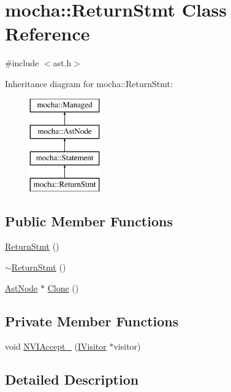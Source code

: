 \hypertarget{classmocha_1_1_return_stmt}{
\section{mocha::ReturnStmt Class Reference}
\label{classmocha_1_1_return_stmt}
}


{\ttfamily \#include $<$ast.h$>$}

Inheritance diagram for mocha::ReturnStmt:\begin{figure}[H]
\begin{center}
\leavevmode
\includegraphics[height=4.000000cm]{classmocha_1_1_return_stmt}
\end{center}
\end{figure}
\subsection*{Public Member Functions}
\begin{DoxyCompactItemize}
\item 
\hyperlink{classmocha_1_1_return_stmt_a416f97238fd91a560a43ecbc970bd61d}{ReturnStmt} ()
\item 
\hyperlink{classmocha_1_1_return_stmt_a5c7ec18f8b005f1970cdd3561222ee05}{$\sim$ReturnStmt} ()
\item 
\hyperlink{classmocha_1_1_ast_node}{AstNode} $\ast$ \hyperlink{classmocha_1_1_return_stmt_a4a65d3a8063b56db840396bbfee0f533}{Clone} ()
\end{DoxyCompactItemize}
\subsection*{Private Member Functions}
\begin{DoxyCompactItemize}
\item 
void \hyperlink{classmocha_1_1_return_stmt_a13dd108e4f098a6f4e1ea39afa217bbc}{NVIAccept\_\-} (\hyperlink{classmocha_1_1_i_visitor}{IVisitor} $\ast$visitor)
\end{DoxyCompactItemize}


\subsection{Detailed Description}


